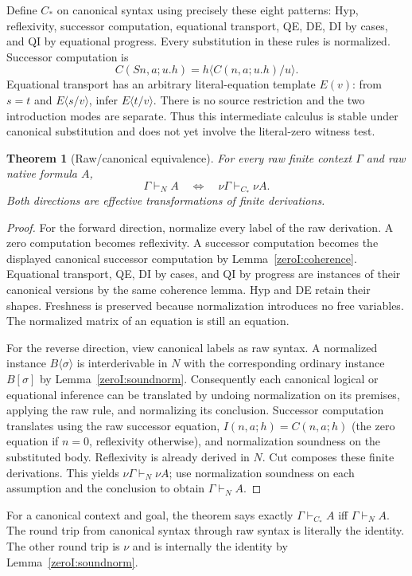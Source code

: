 \documentclass[11pt,a4paper]{article}
\newtheorem{theorem}{Theorem}[section]
\theoremstyle{definition}
\begin{document}
Define $C_*$ on canonical syntax using precisely these eight patterns:
Hyp, reflexivity, successor computation, equational transport, QE, DE,
DI by cases, and QI by equational progress.  Every substitution in these
rules is normalized.  Successor computation is
\[
 C(Sn,a;u.h)=h\langle C(n,a;u.h)/u\rangle.
\]
Equational transport has an arbitrary literal-equation template $E(v)$:
from $s=t$ and $E\langle s/v\rangle$, infer
$E\langle t/v\rangle$.  There is no source restriction and the two
introduction modes are separate.  Thus this intermediate calculus is
stable under canonical substitution and does not yet involve the
literal-zero witness test.

\begin{theorem}[Raw/canonical equivalence]\label{zeroI:equivalence}
For every raw finite context $\Gamma$ and raw native formula $A$,
\[
 \Gamma\vdash_N A
 \quad\Longleftrightarrow\quad
 \nu\Gamma\vdash_{C_*}\nu A.
\]
Both directions are effective transformations of finite derivations.
\end{theorem}
\begin{proof}
For the forward direction, normalize every label of the raw derivation.
A zero computation becomes reflexivity.  A successor computation becomes
the displayed canonical successor computation by
Lemma~\ref{zeroI:coherence}.  Equational transport, QE, DI by cases, and
QI by progress are instances of their canonical versions by the same
coherence lemma.  Hyp and DE retain their shapes.  Freshness is preserved
because normalization introduces no free variables.  The normalized
matrix of an equation is still an equation.

For the reverse direction, view canonical labels as raw syntax.  A
normalized instance $B\langle\sigma\rangle$ is interderivable in $N$
with the corresponding ordinary instance $B[\sigma]$ by
Lemma~\ref{zeroI:soundnorm}.  Consequently each canonical logical or
equational inference can be translated by undoing normalization on its
premises, applying the raw rule, and normalizing its conclusion.
Successor computation translates using the raw successor equation,
$I(n,a;h)=C(n,a;h)$ (the zero equation if $n=0$, reflexivity otherwise),
and normalization soundness on the substituted body.  Reflexivity is
already derived in $N$.  Cut composes these finite derivations.
This yields $\nu\Gamma\vdash_N\nu A$; use normalization soundness on
each assumption and the conclusion to obtain $\Gamma\vdash_N A$.
\end{proof}

For a canonical context and goal, the theorem says exactly
$\Gamma\vdash_{C_*}A$ iff $\Gamma\vdash_NA$.  The round trip from
canonical syntax through raw syntax is literally the identity.  The
other round trip is $\nu$ and is internally the identity by
Lemma~\ref{zeroI:soundnorm}.
\end{document}
